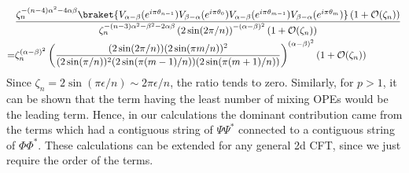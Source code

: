 \documentclass[11pt]{article}
\newcommand{\ep}{\epsilon}
\newcommand{\mO}{\mathcal{O}}
\newcommand{\nn}{\nonumber}
\newcommand{\lb}{\left(}
\newcommand{\rb}{\right)}
\begin{document}
\begin{align}
    &\frac{\zeta_n^{-(n-4)\alpha^2 -4\alpha\beta} \braket{V_{\alpha - \beta}(e^{i\pi \theta_{n-1}})V_{\beta - \alpha}(e^{i\pi\theta_0})V_{\alpha -\beta}(e^{i\pi\theta_{m-1}})V_{\beta - \alpha}(e^{i\pi \theta_{m}})}\lb 1+ \mO(\zeta_n)\rb}{\zeta_n^{-(n-3)\alpha^2 - \beta^2-2\alpha\beta}\lb2\sin(2\pi/n)\rb^{-(\alpha - \beta)^2} \lb 1+ \mO(\zeta_n)\rb}  \\
    =& \zeta_n^{(\alpha-\beta)^2} \lb\frac{(2\sin(2\pi/n))(2\sin(\pi m /n))^2}{(2\sin(\pi/n))^2(2\sin(\pi(m-1)/n))(2\sin(\pi (m+1)/n))}\rb^{(\alpha - \beta)^2}\lb 1+ \mO(\zeta_n)\rb 
\end{align}
Since $\zeta_n = 2\sin(\pi \ep/n) \sim 2\pi \ep/n$, the ratio tends to zero.  
Similarly, for  $p>1$, it can be shown that the term having the least number of mixing OPEs would be the leading term. Hence, in our calculations the dominant contribution came from the terms which had a contiguous string of $\Psi \Psi^*$ connected to a contiguous string of $\Phi \Phi^*$. These calculations can be extended for any general 2d CFT, since we just require the order of the terms. 
\end{document}
